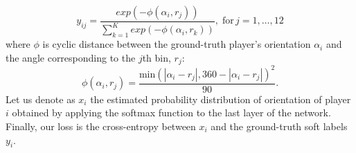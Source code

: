 \documentclass{article}
\newcommand{\cb}[2]{{\sout{#1}}{\color{cyan}#2}}
\begin{document}
\begin{equation}
    y_{ij} = \frac{exp(-\phi (\alpha_{i}, r_{j}))}{\sum_{k=1}^{K}{exp(-\phi (\alpha_{i},r_{k}))}},\; \text{for}\, j=1,\dots,12
\end{equation}
where $\phi$ is cyclic distance between the ground-truth player's orientation  $\alpha_i$ and the angle corresponding to the $j$th bin, $r_{j}$:
\begin{equation}
    \phi(\alpha_{i},r_{j}) = \frac{\text{min}(|\alpha_{i}-r_{j}|,360-|\alpha_{i}-r_{j}|)^{2}}{90}.
\end{equation}
Let us denote as $x_i$ the estimated probability distribution of orientation of player $i$ obtained by applying the softmax function to the last layer of the network. Finally, our loss is the cross-entropy between $x_i$ and the ground-truth soft labels $y_i$. 

\end{document}
